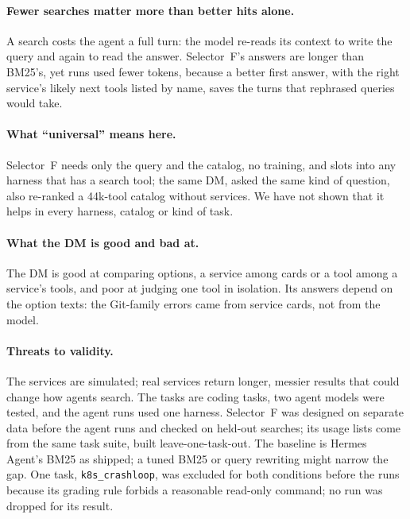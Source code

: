\documentclass[11pt]{article}
\begin{document}
\paragraph{Fewer searches matter more than better hits alone.} A search costs the agent a full turn: the model re-reads
its context to write the query and again to read the answer. Selector~F's answers are longer than BM25's, yet runs used
fewer tokens, because a better first answer, with the right service's likely next tools listed by name, saves the turns
that rephrased queries would take.

\paragraph{What ``universal'' means here.} Selector~F needs only the query and the catalog, no training, and slots into
any harness that has a search tool; the same DM, asked the same kind of question, also re-ranked a 44k-tool catalog
without services. We have not shown that it helps in every harness, catalog or kind of task.

\paragraph{What the DM is good and bad at.} The DM is good at comparing options, a service among cards or a tool among
a service's tools, and poor at judging one tool in isolation. Its answers depend on the option texts: the Git-family
errors came from service cards, not from the model.

\paragraph{Threats to validity.} The services are simulated; real services return longer, messier results that could
change how agents search. The tasks are coding tasks, two agent models were tested, and the agent runs used one
harness. Selector~F was designed on separate data before the agent runs and checked on held-out searches; its usage
lists come from the same task suite, built leave-one-task-out. The baseline is Hermes Agent's BM25 as shipped; a tuned
BM25 or query rewriting might narrow the gap. One task, \texttt{k8s\_crashloop}, was excluded for both conditions before
the runs because its grading rule forbids a reasonable read-only command; no run was dropped for its result.

\end{document}
